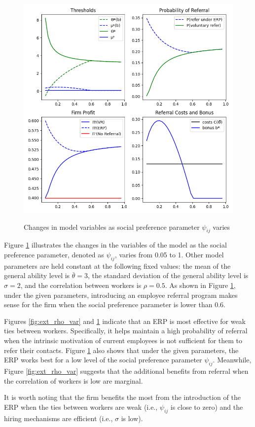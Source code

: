 \documentclass[12pt]{article}
\begin{document}
\begin{figure}[ht]
    \caption{Changes in model variables as social preference parameter $\psi_{ij}$ varies}
    \includegraphics[width=12cm]{images/perf_psi_var.png}
    \centering
    \label{fig:ext_psi_var}
\end{figure}

Figure \ref{fig:ext_psi_var} illustrates the changes in the  variables of the model as the social preference parameter, denoted as $\psi_{ij}$, varies from 0.05 to 1. Other model parameters are held constant at the following fixed values: the mean of the general ability level is $\bar{\theta} = 3$, the standard deviation of the general ability level is $\sigma = 2$, and the correlation between workers is $\rho = 0.5$. As shown in Figure \ref{fig:ext_psi_var}, under the given parameters, introducing an employee referral program makes sense for the firm when the social preference parameter is lower than 0.6.

Figures \ref{fig:ext_rho_var} and \ref{fig:ext_psi_var} indicate that an ERP is most effective for weak ties between workers. Specifically, it helps maintain a high probability of referral when the intrinsic motivation of current employees is not sufficient for them to refer their contacts. Figure \ref{fig:ext_psi_var} also shows that under the given parameters, the ERP works best for a low level of the social preference parameter $\psi_{ij}$. Meanwhile, Figure \ref{fig:ext_rho_var} suggests that the additional benefits from referral when the correlation of workers is low are marginal. 

It is worth noting that the firm benefits the most from the introduction of the ERP when the ties between workers are weak (i.e., $\psi_{ij}$ is close to zero) and the hiring mechanisms are efficient (i.e., $\sigma$ is low). 

\pagebreak
\end{document}

